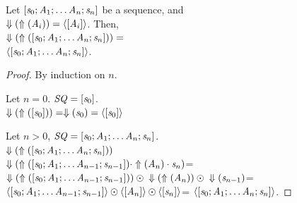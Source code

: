 \documentclass[numbers]{sigplanconf}
\begin{document}



\begin{lemma}
  \label{lem:sequence-rx}
  Let $[\mathit{s}_0;\mathit{A}_1;
    \ldots\mathit{A}_n;\mathit{s}_n]$ be a sequence,
  and\\
  $\Downarrow(\Uparrow(\mathit{A}_i))=\langle[\mathit{A}_i]\rangle$.
  Then,\\$\Downarrow(\Uparrow([\mathit{s}_0;\mathit{A}_1;
    \ldots\mathit{A}_n;\mathit{s}_n]))=$\\
  $\langle[\mathit{s}_0;\mathit{A}_1;
      \ldots\mathit{A}_n;\mathit{s}_n]\rangle$.
\end{lemma}
\begin{proof}
  By induction on $n$.

  Let $n=0$.
  $\mathit{SQ}=[\mathit{s}_0]$.\\
  $\Downarrow(\Uparrow([\mathit{s}_0]))=
  \Downarrow(\mathit{s}_0)=\langle[\mathit{s}_0]\rangle$

  Let $n>0$,
  $\mathit{SQ}=[\mathit{s}_0;\mathit{A}_1;
    \ldots\mathit{A}_n;\mathit{s}_n]$.\\
  $\Downarrow(\Uparrow([\mathit{s}_0;\mathit{A}_1;
    \ldots\mathit{A}_n;\mathit{s}_n]))$\\
  $\Downarrow(\Uparrow([\mathit{s}_0;\mathit{A}_1;
    \ldots\mathit{A}_{n-1};\mathit{s}_{n-1}])\cdot\Uparrow(\mathit{A}_n)
  \cdot\mathit{s}_n)$=\\
  $\Downarrow(\Uparrow([\mathit{s}_0;\mathit{A}_1;
    \ldots\mathit{A}_{n-1};\mathit{s}_{n-1}]))
  \odot\\
  \Downarrow(\Uparrow(\mathit{A}_n))
  \odot\\
  \Downarrow(\mathit{s}_{n-1})$=
  $\langle[\mathit{s}_0;\mathit{A}_1;
      \ldots\mathit{A}_{n-1};\mathit{s}_{n-1}]\rangle
  \odot\\
  \langle[\mathit{A}_n]\rangle
  \odot
  \langle[\mathit{s}_n]\rangle$=
  $\langle[\mathit{s}_0;\mathit{A}_1;
      \ldots\mathit{A}_n;\mathit{s}_n]\rangle$.
\end{proof}
\end{document}
